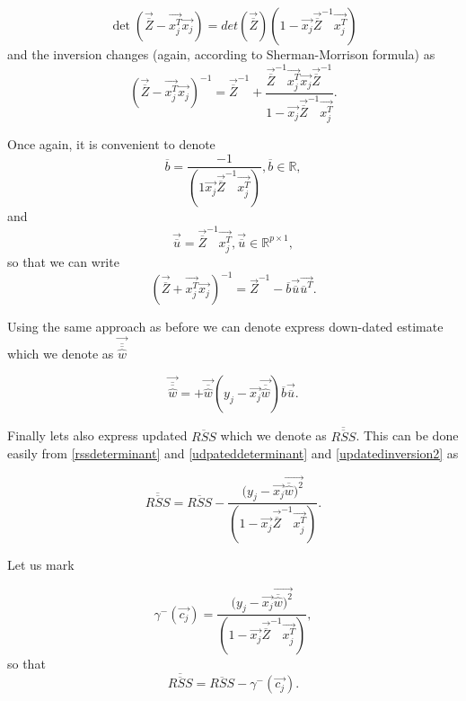 \begin{equation} 
    \det(\vec{\overline{Z}} - \vec{x_j^T}\vec{x_j}) = det(\vec{\overline{Z}})(1 - \vec{x_j}\vec{\overline{Z}}^{-1}\vec{x_j^T})
\end{equation}
and the inversion changes (again, according to Sherman-Morrison formula) as 
\begin{equation}  
    (\vec{\overline{Z}} - \vec{x_j^T}\vec{x_j})^{-1} = \vec{\overline{Z}}^{-1} + \dfrac{\vec{\overline{Z}}^{-1}\vec{x_j^T}\vec{x_j}\vec{\overline{Z}}^{-1}}{1 - \vec{x_j}\vec{\overline{Z}}^{-1}\vec{x_j^T}}.
\end{equation}

Once again, it is convenient to denote
\begin{equation}
    \overline{b} = \dfrac{-1}{(1  \vec{x_j}\vec{\overline{Z}}^{-1}\vec{x_j^T})},  \overline{b} \in \mathbb{R},
\end{equation}
and 
\begin{equation}
    \vec{\overline{u}} = \vec{\overline{Z}}^{-1}\vec{x_j^T},      \vec{\overline{u}} \in \mathbb{R}^{p \times 1},
\end{equation}
so that we can write
\begin{equation} \label{updatedinversion2}
    (\vec{\overline{Z}} + \vec{x_j^T}\vec{x_j})^{-1} = \vec{Z}^{-1} - \overline{b}\vec{\overline{u}}\vec{\overline{u}^T}.
\end{equation}

Using the same approach as before we can denote express down-dated estimate which we denote as $\vec{\overline{\overline{\hat{w}}}}$

\begin{equation} \label{thetaminus}
    \vec{\overline{\overline{\hat{w}}}} =  +\vec{\overline{\hat{w}}} (y_j - \vec{x_j}\vec{\overline{\hat{w}}}) \overline{b} \vec{\overline{u}}.
\end{equation}

Finally lets also express updated $\overline{RSS}$ which we denote as $\overline{\overline{RSS}}$. This can be done easily from \ref{rssdeterminant} and \ref{udpateddeterminant} and \eqref{updatedinversion2} as 

\begin{equation}
    \overline{\overline{RSS}} =  \overline{RSS} - \dfrac{(y_j - \vec{x_j}\vec{\overline{\hat{w}})^2}}{(1 - \vec{x_j}\vec{\overline{{Z}}}^{-1}\vec{x_j^T})}.
\end{equation}

Let us mark

\begin{equation} \label{gamma:minus}
    \gamma^{-}(\vec{c_j}) = \dfrac{(y_j - \vec{x_j}\vec{\overline{\hat{w}})^2}}{(1 - \vec{x_j}\vec{\overline{{Z}}}^{-1}\vec{x_j^T})},
\end{equation}
so that 
\begin{equation} \label{rssminus}
    \overline{\overline{RSS}} =  \overline{RSS} - \gamma^{-}(\vec{c_j}).
\end{equation}



